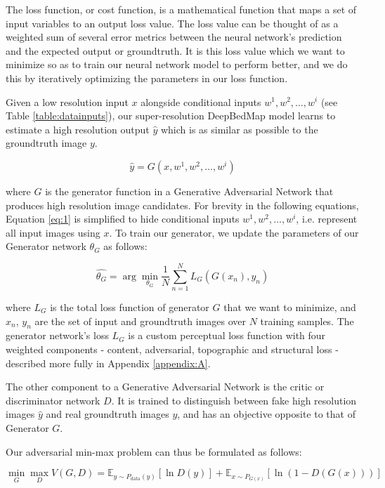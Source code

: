 \documentclass[tc, manuscript]{copernicus}
\begin{document}
The loss function, or cost function, is a mathematical function that maps a set of input variables to an output loss value.
The loss value can be thought of as a weighted sum of several error metrics between the neural network's prediction and the expected output or groundtruth.
It is this loss value which we want to minimize so as to train our neural network model to perform better, and we do this by iteratively optimizing the parameters in our loss function.

Given a low resolution input $x$ alongside conditional inputs $w^1, w^2, \dots, w^i$ (see Table \ref{table:datainputs}), our super-resolution DeepBedMap model learns to estimate a high resolution output $\hat{y}$ which is as similar as possible to the groundtruth image $y$.

\begin{equation}\label{eq:1}
  \hat{y} = G(x, w^1, w^2, \dots, w^i)
\end{equation}

where $G$ is the generator function in a Generative Adversarial Network that produces high resolution image candidates.
For brevity in the following equations, Equation \eqref{eq:1} is simplified to hide conditional inputs $w^1, w^2, \dots, w^i$, i.e. represent all input images using $x$.
To train our generator, we update the parameters of our Generator network $\theta_G$ as follows:

\begin{equation}\label{eq:2}
  \hat{\theta_G} = \arg\min_{\theta_G} \frac{1}{N}\sum_{n=1}^{N}L_G(G(x_n), y_n)
\end{equation}

where $L_G$ is the total loss function of generator $G$ that we want to minimize, and $x_n$, $y_n$ are the set of input and groundtruth images over $N$ training samples.
The generator network's loss $L_G$ is a custom perceptual loss function with four weighted components - content, adversarial, topographic and structural loss - described more fully in Appendix \ref{appendix:A}.

The other component to a Generative Adversarial Network is the critic or discriminator network $D$.
It is trained to distinguish between fake high resolution images $\hat{y}$ and real groundtruth images $y$, and has an objective opposite to that of Generator $G$.

Our adversarial min-max problem can thus be formulated as follows:

\begin{equation}\label{eq:3}
  \min_{G} \max_{D} V(G,D) = \mathbb{E}_{y \sim P_{\text{data}}(y)}[\ln D(y)] + \mathbb{E}_{x \sim P_{G(x)}}[\ln(1-D(G(x)))]
\end{equation}
\end{document}
